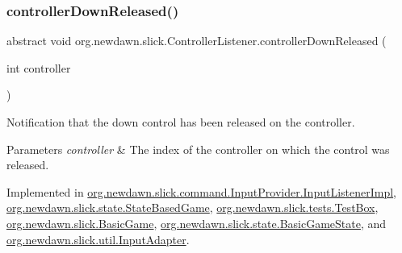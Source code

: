 \mbox{\label{interfaceorg_1_1newdawn_1_1slick_1_1_controller_listener_a7d0ca99c8cd5b0d332bece1d17befee7}} 
\subsubsection{\texorpdfstring{controller\+Down\+Released()}{controllerDownReleased()}}
{\footnotesize\ttfamily abstract void org.\+newdawn.\+slick.\+Controller\+Listener.\+controller\+Down\+Released (\begin{DoxyParamCaption}\item[{int}]{controller }\end{DoxyParamCaption})\hspace{0.3cm}{\ttfamily [abstract]}}

Notification that the down control has been released on the controller.


\begin{DoxyParams}{Parameters}
{\em controller} & The index of the controller on which the control was released. \\
\hline
\end{DoxyParams}


Implemented in \mbox{\hyperlink{classorg_1_1newdawn_1_1slick_1_1command_1_1_input_provider_1_1_input_listener_impl_a088db9874120ee50128d286f0c2f4d87}{org.\+newdawn.\+slick.\+command.\+Input\+Provider.\+Input\+Listener\+Impl}}, \mbox{\hyperlink{classorg_1_1newdawn_1_1slick_1_1state_1_1_state_based_game_a510241b92e4f3670e04d240ecc5b797a}{org.\+newdawn.\+slick.\+state.\+State\+Based\+Game}}, \mbox{\hyperlink{classorg_1_1newdawn_1_1slick_1_1tests_1_1_test_box_af8a047e0bfc8291159b6bdd5b5158dc3}{org.\+newdawn.\+slick.\+tests.\+Test\+Box}}, \mbox{\hyperlink{classorg_1_1newdawn_1_1slick_1_1_basic_game_a8953e34950de681231d62cb8e7297263}{org.\+newdawn.\+slick.\+Basic\+Game}}, \mbox{\hyperlink{classorg_1_1newdawn_1_1slick_1_1state_1_1_basic_game_state_a8e728a45fed4846429f29299f4dba44f}{org.\+newdawn.\+slick.\+state.\+Basic\+Game\+State}}, and \mbox{\hyperlink{classorg_1_1newdawn_1_1slick_1_1util_1_1_input_adapter_a6cb307438dc81cba0ec7a9f6b4dbc887}{org.\+newdawn.\+slick.\+util.\+Input\+Adapter}}.

